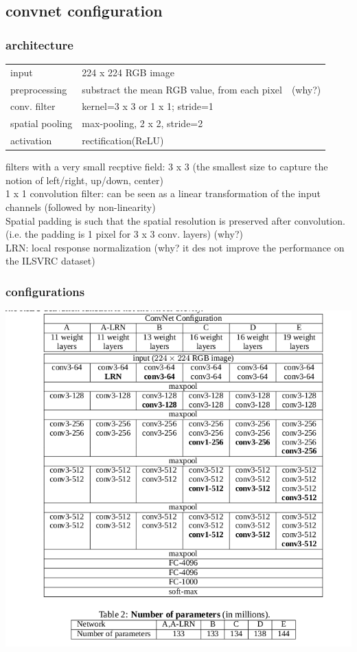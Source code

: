 \documentclass[11pt]{article}
\begin{document}
\subsection{convnet configuration}
\label{sec-2-3}
\subsubsection{architecture}
\label{sec-2-3-1}
\begin{center}
\begin{tabular}{lll}
input & 224 x 224 RGB image & \\
preprocessing & substract the mean RGB value, from each pixel & (why?)\\
conv. filter & kernel=3 x 3 or 1 x 1; stride=1 & \\
spatial pooling & max-pooling, 2 x 2, stride=2 & \\
activation & rectification(ReLU) & \\
\end{tabular}
\end{center}

filters with a very small recptive field: 3 x 3 (the smallest size to capture the notion of left/right, up/down, center) \\
1 x 1 convolution filter: can be seen as a linear transformation of the input channels (followed by non-linearity) \\


Spatial padding is such that the spatial resolution is preserved after convolution. (i.e. the padding is 1 pixel for 3 x 3 conv. layers) (why?) \\

LRN: local response normalization (why? it des not improve the performance on the ILSVRC dataset) \\

\subsubsection{configurations}
\label{sec-2-3-2}
\includegraphics[width=.9\linewidth]{pics/vgg.png} \\
\end{document}
